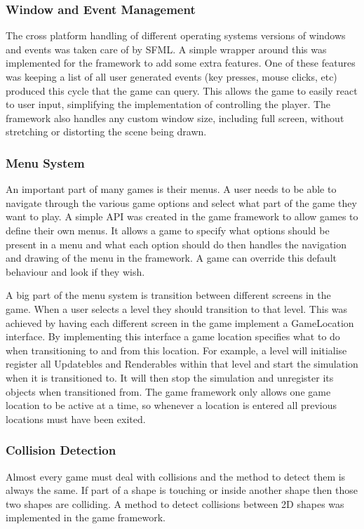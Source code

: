 \documentclass[]{report}
\begin{document}
			\subsubsection{Window and Event Management}
			The cross platform handling of different operating systems versions of windows and events was taken care of by SFML. A simple wrapper around this was implemented for the framework to add some extra features. One of these features was keeping a list of all user generated events (key presses, mouse clicks, etc) produced this cycle that the game can query. This allows the game to easily react to user input, simplifying the implementation of controlling the player. The framework also handles any custom window size, including full screen, without stretching or distorting the scene being drawn.
			
			\subsubsection{Menu System}
			An important part of many games is their menus. A user needs to be able to navigate through the various game options and select what part of the game they want to play. A simple API was created in the game framework to allow games to define their own menus. It allows a game to specify what options should be present in a menu and what each option should do then handles the navigation and drawing of the menu in the framework. A game can override this default behaviour and look if they wish.
			
			A big part of the menu system is transition between different screens in the game. When a user selects a level they should transition to that level. This was achieved by having each different screen in the game implement a GameLocation interface. By implementing this interface a game location specifies what to do when transitioning to and from this location. For example, a level will initialise register all Updatebles and Renderables within that level and start the simulation when it is transitioned to. It will then stop the simulation and unregister its objects when transitioned from. The game framework only allows one game location to be active at a time, so whenever a location is entered all previous locations must have been exited.
			
			\subsubsection{Collision Detection}
			Almost every game must deal with collisions and the method to detect them is always the same. If part of a shape is touching or inside another shape then those two shapes are colliding. A method to detect collisions between 2D shapes was implemented in the game framework.
			
\end{document}
